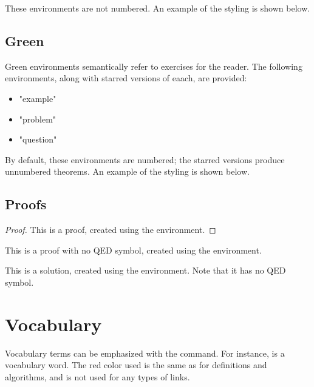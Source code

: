 \documentclass{l3doc}
\begin{document}
These environments are not numbered. An example of the styling is shown below.

\begin{remark}
  \lipsum[1][1-6]
\end{remark}

\subsection{Green}

Green environments semantically refer to exercises for the reader. The following environments, along with starred versions of eaach, are provided: \begin{itemize}
  \item "example"
  \item "problem"
  \item "question"
\end{itemize}

By default, these environments are numbered; the starred versions produce unnumbered theorems. An example of the styling is shown below.

\begin{example*}
  \lipsum[1][1-6]
\end{example*}

\subsection{Proofs}

\begin{proof}
  This is a proof, created using the  environment.
\end{proof}

\begin{proof*}
  This is a proof with no QED symbol, created using the  environment.
\end{proof*}

\begin{solution}
  This is a solution, created using the  environment. Note that it has no QED symbol.
\end{solution}

\section{Vocabulary}

\begin{function}{\vocab}
  \begin{syntax}
     
  \end{syntax}

  Vocabulary terms can be emphasized with the  command. For instance,  is a vocabulary word. The red color used is the same as for definitions and algorithms, and is not used for any types of links.
\end{function}
\end{document}
